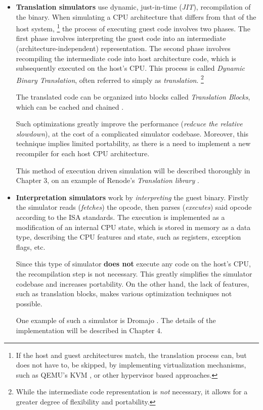 \begin{itemize}
	\item{\textbf{Translation simulators} use dynamic, just-in-time (\textit{JIT}), recompilation of the binary.
	When simulating a CPU architecture that differs from that of the host system,%
	\footnote{If the host and guest architectures match, the translation process can, but does not have to, be skipped,
	by implementing virtualization mechanisms, such as QEMU's KVM \cite{QemuKVM}, or other hypervisor based approaches.}
	the process of executing guest code involves two phases. The first phase involves interpreting the guest code into
	an intermediate (architecture-independent) representation. The second phase involves recompiling the intermediate
	code into host architecture code, which is subsequently executed on the host's CPU. This process is called
	\textit{Dynamic Binary Translation}, often referred to simply as \textit{translation}.%
	\footnote{While the intermediate code representation is \textit{not} necessary, it allows for a greater degree of
	flexibility and portability.}

	The translated code can be organized into blocks called \textit{Translation Blocks}, which can be cached and
	chained \cite{Qemu}.

	Such optimizations greatly improve the performance (\textit{redcuce the relative slowdown}), at the
	cost of a complicated simulator codebase. Moreover, this technique implies limited portability, as there is a need
	to implement a new recompiler for each host CPU architecture.

	This method of execution driven simulation will be described thoroughly in Chapter 3, on an example of Renode's
	\textit{Translation library} \cite{Tlib}.}
	\item{\textbf{Interpretation simulators} work by \textit{interpreting} the guest binary. Firstly the simulator
	reads (\textit{fetches}) the opcode, then parses (\textit{executes}) said opcode according to the ISA standards.
	The execution is implemented as a modification of an internal CPU state, which is stored in memory as a data type,
	describing the CPU features and state, such as registers, exception flags, etc.

	Since this type of simulator \textbf{does not} execute any code on the host's CPU, the recompilation step is not
	necessary. This greatly simplifies the simulator codebase and increases portability. On the other hand, the lack of
	features, such as translation blocks, makes various optimization techniques not possible.

	One example of such a simulator is Dromajo \cite{Dromajo}. The details of the implementation will be described in
	Chapter 4.}
\end{itemize}


